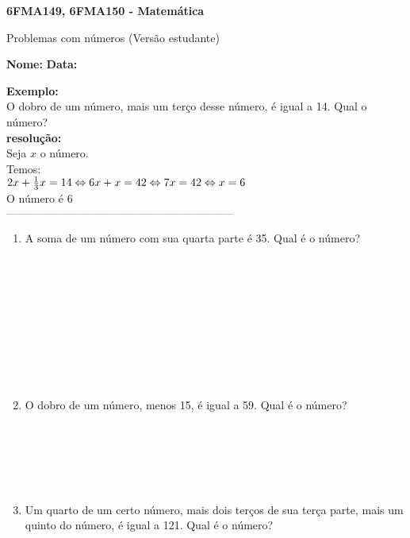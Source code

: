 \documentclass[a4paper,14pt]{article}
\begin{document}
	
	\noindent\textbf{6FMA149, 6FMA150 - Matemática} 
	
	\begin{center}Problemas com números (Versão estudante)
	\end{center}
	
	\noindent\textbf{Nome:} \underline{\hspace{10cm}}
	\noindent\textbf{Data:} \underline{\hspace{4cm}}
	
	
	\begin{multicols}{2}
	    \noindent \textbf{Exemplo:} \\
	    O dobro de um número, mais um terço desse número, é igual a 14. Qual o número? \\
	    \noindent \textbf{resolução:} \\
	    Seja $x$ o número. \\
	    Temos: \\
	    $2x + \frac{1}{3}x = 14 \Leftrightarrow 6x + x = 42 \\ \Leftrightarrow 7x = 42 \Leftrightarrow x = 6$ \\
	    O número é 6 \\
		\noindent\textsubscript{--------------------------------------------------------------------------}
		\begin{enumerate} 
			\item A soma de um número com sua quarta parte é 35. Qual é o número? \\\\\\\\\\\\\\\\\\\\
			\item O dobro de um número, menos 15, é igual a 59. Qual é o número? \\\\\\\\\\\\
			\item Um quarto de um certo número, mais dois terços de sua terça parte, mais um quinto do número, é igual a 121. Qual é o número? \\\\\\\\\\\\\\\\\\\\\\\\\\\\\\

\end{enumerate}
\end{multicols}
\end{document}

